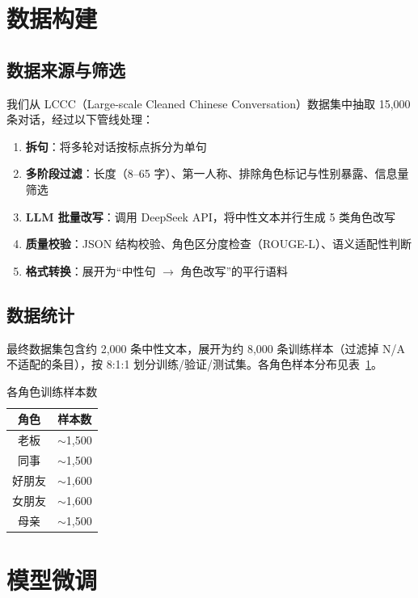 \documentclass[12pt,a4paper]{article}
\begin{document}
\section{数据构建}

\subsection{数据来源与筛选}

我们从 LCCC\cite{wang2020chinese}（Large-scale Cleaned Chinese Conversation）数据集中抽取 15,000 条对话，经过以下管线处理：

\begin{enumerate}[leftmargin=2em]
    \item \textbf{拆句}：将多轮对话按标点拆分为单句
    \item \textbf{多阶段过滤}：长度（8--65 字）、第一人称、排除角色标记与性别暴露、信息量筛选
    \item \textbf{LLM 批量改写}：调用 DeepSeek API，将中性文本并行生成 5 类角色改写
    \item \textbf{质量校验}：JSON 结构校验、角色区分度检查（ROUGE-L）、语义适配性判断
    \item \textbf{格式转换}：展开为“中性句 $\rightarrow$ 角色改写”的平行语料
\end{enumerate}

\subsection{数据统计}

最终数据集包含约 2,000 条中性文本，展开为约 8,000 条训练样本（过滤掉 N/A 不适配的条目），按 8:1:1 划分训练/验证/测试集。各角色样本分布见表~\ref{tab:data}。

\begin{table}[H]
\centering
\caption{各角色训练样本数}
\label{tab:data}
\begin{tabular}{c|c}
\toprule
角色 & 样本数 \\
\midrule
老板       & $\sim$1,500 \\
同事       & $\sim$1,500 \\
好朋友     & $\sim$1,600 \\
女朋友     & $\sim$1,600 \\
母亲       & $\sim$1,500 \\
\bottomrule
\end{tabular}
\end{table}

\section{模型微调}
\end{document}
